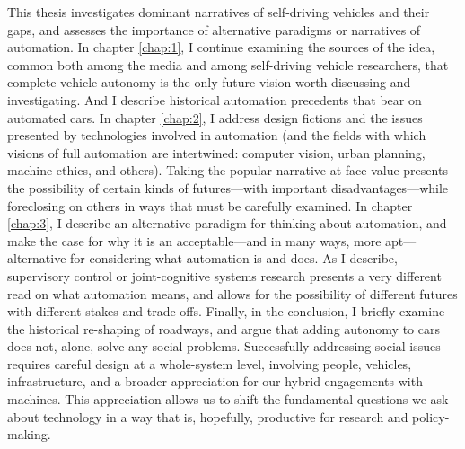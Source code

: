 


This thesis investigates dominant narratives of
self-driving vehicles and their gaps, and assesses the importance of
alternative paradigms or narratives of automation. In chapter \ref{chap:1}, I continue examining
the sources of the idea, common both among the media and among
self-driving vehicle researchers, that complete vehicle autonomy is
the only future vision worth discussing and investigating. And I
describe historical automation precedents that bear on automated cars. In chapter
\ref{chap:2}, I address design fictions and the issues presented by technologies involved in
automation (and the fields with which visions of full automation are
intertwined: computer vision, urban planning, machine ethics, and
others). Taking the popular narrative at face value presents the
possibility of certain kinds of futures---with important
disadvantages---while foreclosing on others in ways that must be
carefully examined. In chapter \ref{chap:3}, I
describe an alternative paradigm for thinking about automation, and
make the case for why it is an acceptable---and in
many ways, more apt---alternative for considering what automation is
and does. As I describe, supervisory control or joint-cognitive
systems research presents a very
different read on what automation means, and allows for the possibility of different futures with
different stakes and trade-offs. Finally, in the conclusion, I briefly examine the
historical re-shaping of roadways, and argue that adding autonomy to cars does not,
alone, solve any social problems. Successfully addressing social
issues requires careful design at a whole-system level, involving
people, vehicles, infrastructure, and a broader appreciation for our hybrid
engagements with machines. This appreciation allows us to shift the fundamental
questions we ask about technology in a way that is, hopefully,
productive for research and policy-making.


